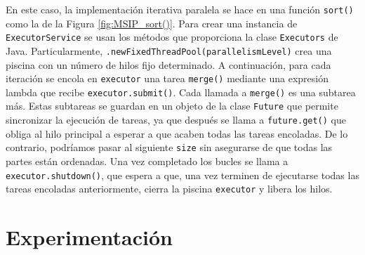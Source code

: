 \documentclass[titlepage]{article}
\begin{document}
En este caso, la implementación iterativa paralela se hace en una función \lstinline{sort() } como la de la Figura \ref{fig:MSIP_sort()}. Para crear una instancia de \lstinline{ExecutorService} se usan los métodos que proporciona la clase \lstinline{Executors} de Java. Particularmente, \lstinline{.newFixedThreadPool(parallelismLevel)} crea una piscina con un número de hilos fijo determinado. A continuación, para cada iteración se encola en \lstinline{executor} una tarea \lstinline{merge()} mediante una expresión lambda que recibe \lstinline{executor.submit()}. Cada llamada a \lstinline{merge()} es una subtarea más. Estas subtareas se guardan en un objeto de la clase \lstinline{Future} que permite sincronizar la ejecución de tareas, ya que después se llama a \lstinline{future.get()} que obliga al hilo principal a esperar a que acaben todas las tareas encoladas. De lo contrario, podríamos pasar al siguiente \lstinline{size} sin asegurarse de que todas las partes están ordenadas. Una vez completado los bucles se llama a \lstinline{executor.shutdown()}, que espera a que, una vez terminen de ejecutarse todas las tareas encoladas anteriormente, cierra la piscina \lstinline{executor} y libera los hilos.



\newpage

\section{Experimentación}
\end{document}
